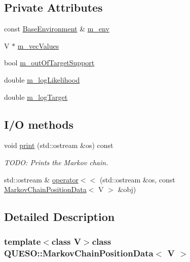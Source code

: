 \subsection*{Private Attributes}
\begin{DoxyCompactItemize}
\item 
const \hyperlink{class_q_u_e_s_o_1_1_base_environment}{Base\-Environment} \& \hyperlink{class_q_u_e_s_o_1_1_markov_chain_position_data_a61841c4f47bd11a7261668bb44e06bd6}{m\-\_\-env}
\item 
V $\ast$ \hyperlink{class_q_u_e_s_o_1_1_markov_chain_position_data_ad98640fe86c2c70671467686988c6b91}{m\-\_\-vec\-Values}
\item 
bool \hyperlink{class_q_u_e_s_o_1_1_markov_chain_position_data_ac2dba3d144c038ccc297e95033331437}{m\-\_\-out\-Of\-Target\-Support}
\item 
double \hyperlink{class_q_u_e_s_o_1_1_markov_chain_position_data_a2def4815940aee10948cd6575f986010}{m\-\_\-log\-Likelihood}
\item 
double \hyperlink{class_q_u_e_s_o_1_1_markov_chain_position_data_a0d806977350824012500dca13e890a93}{m\-\_\-log\-Target}
\end{DoxyCompactItemize}
\subsection*{I/\-O methods}
\begin{DoxyCompactItemize}
\item 
void \hyperlink{class_q_u_e_s_o_1_1_markov_chain_position_data_a25bc5762fc4883882ca635dd83772a78}{print} (std\-::ostream \&os) const 
\begin{DoxyCompactList}\small\item\em T\-O\-D\-O\-: Prints the Markov chain. \end{DoxyCompactList}\item 
std\-::ostream \& \hyperlink{class_q_u_e_s_o_1_1_markov_chain_position_data_a6ef33eb48213225a4ad86c5baf209257}{operator$<$$<$} (std\-::ostream \&os, const \hyperlink{class_q_u_e_s_o_1_1_markov_chain_position_data}{Markov\-Chain\-Position\-Data}$<$ V $>$ \&obj)
\end{DoxyCompactItemize}


\subsection{Detailed Description}
\subsubsection*{template$<$class V$>$class Q\-U\-E\-S\-O\-::\-Markov\-Chain\-Position\-Data$<$ V $>$}

